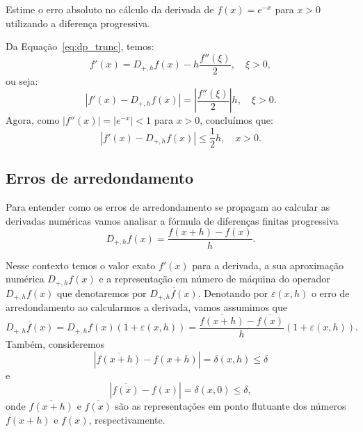 \begin{ex}
Estime o erro absoluto no cálculo da derivada de $f(x)=e^{-x}$ para $x>0$ utilizando a diferença progressiva.
\end{ex}
\begin{sol}
Da Equação~\ref{eq:dp_trunc}, temos:
\begin{equation}
  f'(x) = D_{+,h}f(x) - h\frac{f''(\xi)}{2},\quad \xi>0,
\end{equation}
ou seja:
\begin{equation}
  |f'(x) - D_{+,h}f(x)| = \left|\frac{f''(\xi)}{2}\right|h,\quad \xi>0.
\end{equation}
Agora, como $|f''(x)| = |e^{-x}| < 1$ para $x>0$, concluímos que:
\begin{equation}
  |f'(x) - D_{+,h}f(x)| \leq \frac{1}{2}h,\quad x>0.
\end{equation}
\end{sol}

\subsection{Erros de arredondamento}
Para entender como os erros de arredondamento se propagam ao calcular as derivadas numéricas vamos analisar a fórmula de diferenças finitas progressiva
\begin{equation}
  D_{+,h}f(x) =\frac{f(x+h)-f(x)}{h}.  
\end{equation}

Nesse contexto temos o valor exato $f'(x)$ para a derivada, a sua aproximação numérica $D_{+,h}f(x)$ e a representação em número de máquina do operador $D_{+,h}f(x)$ que denotaremos por $\overline{D_{+,h}f(x)}$. Denotando por $\varepsilon(x,h)$ o erro de arredondamento ao calcularmos a derivada, vamos assumimos que
\begin{equation}\label{ex:ea_dp}
\overline{D_{+,h}f(x)}=D_{+,h}f(x)(1+\varepsilon(x,h))=\frac{\overline{f(x+h)}-\overline{f(x)}}{h}(1+\varepsilon(x,h)).  
\end{equation}
Também, consideremos
\begin{equation}
|\overline{f(x+h)}-f(x+h)|=\delta(x,h)\leq \delta  
\end{equation}
e
\begin{equation}
  |\overline{f(x)}-f(x)|=\delta(x,0)\leq \delta,  
\end{equation}
onde $\overline{f(x+h)}$ e $\overline{f(x)}$ são as representações em ponto flutuante dos números $f(x+h)$ e $f(x)$, respectivamente. 

